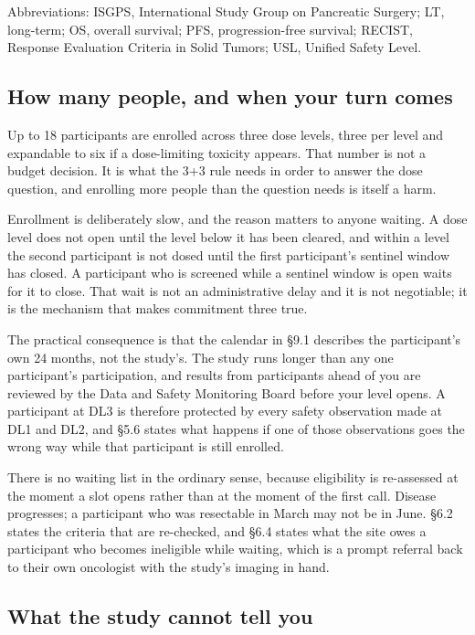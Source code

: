 \vspace{0.30em}

\noindent Abbreviations: ISGPS, International Study Group on Pancreatic Surgery;
LT, long-term; OS, overall survival; PFS, progression-free survival; RECIST,
Response Evaluation Criteria in Solid Tumors; USL, Unified Safety Level.

\subsection{How many people, and when your turn comes}

Up to 18 participants are enrolled across three dose levels, three per level and
expandable to six if a dose-limiting toxicity appears. That number is not a
budget decision. It is what the 3+3 rule needs in order to answer the dose
question, and enrolling more people than the question needs is itself a harm.

Enrollment is deliberately slow, and the reason matters to anyone waiting. A
dose level does not open until the level below it has been cleared, and within a
level the second participant is not dosed until the first participant's sentinel
window has closed. A participant who is screened while a sentinel window is open
waits for it to close. That wait is not an administrative delay and it is not
negotiable; it is the mechanism that makes commitment three true.

The practical consequence is that the calendar in \S 9.1 describes the
participant's own 24 months, not the study's. The study runs longer than any one
participant's participation, and results from participants ahead of you are
reviewed by the Data and Safety Monitoring Board before your level opens. A
participant at DL3 is therefore protected by every safety observation made at
DL1 and DL2, and \S 5.6 states what happens if one of those observations goes
the wrong way while that participant is still enrolled.

There is no waiting list in the ordinary sense, because eligibility is
re-assessed at the moment a slot opens rather than at the moment of the first
call. Disease progresses; a participant who was resectable in March may not be
in June. \S 6.2 states the criteria that are re-checked, and \S 6.4 states what
the site owes a participant who becomes ineligible while waiting, which is a
prompt referral back to their own oncologist with the study's imaging in hand.

\subsection{What the study cannot tell you}

